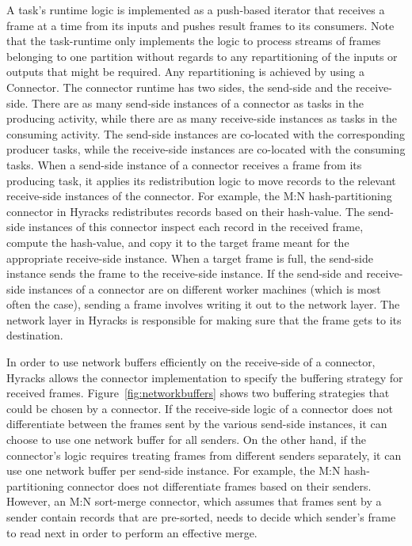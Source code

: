 A task's runtime logic is implemented as a push-based iterator that receives a frame at a time from its inputs and pushes result frames to its consumers. Note that the task-runtime only
implements the logic to process streams of frames belonging to one partition without regards to any repartitioning of the inputs or outputs that might be required. Any
repartitioning is achieved by using a Connector. The connector runtime has two sides, the send-side and the receive-side. There are as many send-side instances of a connector
as tasks in the producing activity, while there are as many receive-side instances as tasks in the consuming activity. The send-side instances are co-located with the
corresponding producer tasks, while the receive-side instances are co-located with the consuming tasks. When a send-side instance of a connector receives a frame from its
producing task, it applies its redistribution logic to move records to the relevant receive-side instances of the connector. For example, the M:N hash-partitioning
connector in Hyracks redistributes records based on their hash-value. The send-side instances of this connector inspect each record in the received frame, compute
the hash-value, and copy it to the target frame meant for the appropriate receive-side instance. When a target frame is full, the send-side instance sends the frame to
the receive-side instance. If the send-side and receive-side instances of a connector are on different worker machines (which is most often the case), sending a frame
involves writing it out to the network layer. The network layer in Hyracks is responsible for making sure that the frame gets to its destination.

In order to use network buffers efficiently on the receive-side of a connector, Hyracks allows the connector implementation to specify the buffering strategy for received
frames. Figure~\ref{fig:networkbuffers} shows two buffering strategies that could be chosen by a connector. If the receive-side logic of a connector does not differentiate
between the frames sent by the various send-side instances, it can choose to use one network buffer for all senders. On the other hand, if the connector's logic requires
treating frames from different senders separately, it can use one network buffer per send-side instance. For example, the M:N hash-partitioning connector does not differentiate
frames based on their senders. However, an M:N sort-merge connector, which assumes that frames sent by a sender contain records that are pre-sorted, needs to decide which
sender's frame to read next in order to perform an effective merge.

